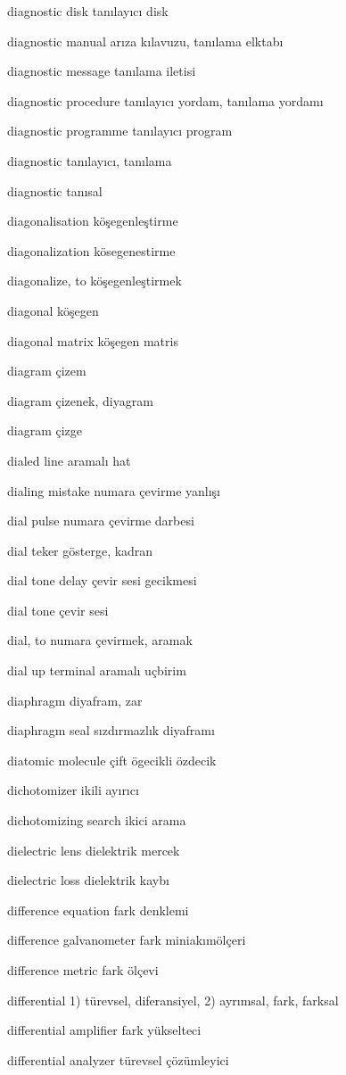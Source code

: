 \documentclass[12pt,fleqn]{article}\usepackage{../../common}
\begin{document}
diagnostic disk tanılayıcı disk

diagnostic manual arıza kılavuzu, tanılama elktabı

diagnostic message tanılama iletisi

diagnostic procedure tanılayıcı yordam, tanılama yordamı

diagnostic programme tanılayıcı program

diagnostic tanılayıcı, tanılama

diagnostic tanısal

diagonalisation köşegenleştirme

diagonalization kösegenestirme

diagonalize, to köşegenleştirmek

diagonal köşegen

diagonal matrix köşegen matris

diagram çizem

diagram çizenek, diyagram

diagram çizge

dialed line aramalı hat

dialing mistake numara çevirme yanlışı

dial pulse numara çevirme darbesi

dial teker gösterge, kadran

dial tone delay çevir sesi gecikmesi

dial tone çevir sesi

dial, to numara çevirmek, aramak

dial up terminal aramalı uçbirim

diaphragm diyafram, zar

diaphragm seal sızdırmazlık diyaframı

diatomic molecule çift ögecikli özdecik

dichotomizer ikili ayırıcı

dichotomizing search ikici arama

dielectric lens dielektrik mercek

dielectric loss dielektrik kaybı

difference equation fark denklemi

difference galvanometer fark miniakımölçeri

difference metric fark ölçevi

differential 1) türevsel, diferansiyel, 2) ayrımsal, fark, farksal

differential amplifier fark yükselteci

differential analyzer türevsel çözümleyici
\end{document}
